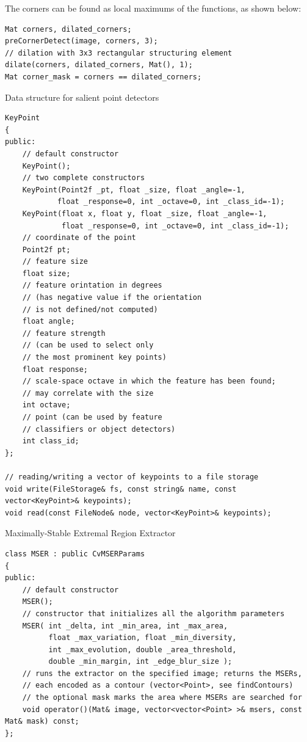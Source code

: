 The corners can be found as local maximums of the functions, as shown below:

\begin{lstlisting}
Mat corners, dilated_corners;
preCornerDetect(image, corners, 3);
// dilation with 3x3 rectangular structuring element
dilate(corners, dilated_corners, Mat(), 1);
Mat corner_mask = corners == dilated_corners;
\end{lstlisting}


Data structure for salient point detectors

\begin{lstlisting}
KeyPoint
{
public:
    // default constructor
    KeyPoint();
    // two complete constructors
    KeyPoint(Point2f _pt, float _size, float _angle=-1,
            float _response=0, int _octave=0, int _class_id=-1);
    KeyPoint(float x, float y, float _size, float _angle=-1,
             float _response=0, int _octave=0, int _class_id=-1);
    // coordinate of the point
    Point2f pt;
    // feature size
    float size;
    // feature orintation in degrees
    // (has negative value if the orientation
    // is not defined/not computed)
    float angle;
    // feature strength
    // (can be used to select only
    // the most prominent key points)
    float response;
    // scale-space octave in which the feature has been found;
    // may correlate with the size
    int octave;
    // point (can be used by feature
    // classifiers or object detectors)
    int class_id;
};

// reading/writing a vector of keypoints to a file storage
void write(FileStorage& fs, const string& name, const vector<KeyPoint>& keypoints);
void read(const FileNode& node, vector<KeyPoint>& keypoints);    
\end{lstlisting}


Maximally-Stable Extremal Region Extractor

\begin{lstlisting}
class MSER : public CvMSERParams
{
public:
    // default constructor
    MSER();
    // constructor that initializes all the algorithm parameters
    MSER( int _delta, int _min_area, int _max_area,
          float _max_variation, float _min_diversity,
          int _max_evolution, double _area_threshold,
          double _min_margin, int _edge_blur_size );
    // runs the extractor on the specified image; returns the MSERs,
    // each encoded as a contour (vector<Point>, see findContours)
    // the optional mask marks the area where MSERs are searched for
    void operator()(Mat& image, vector<vector<Point> >& msers, const Mat& mask) const;
};
\end{lstlisting}

